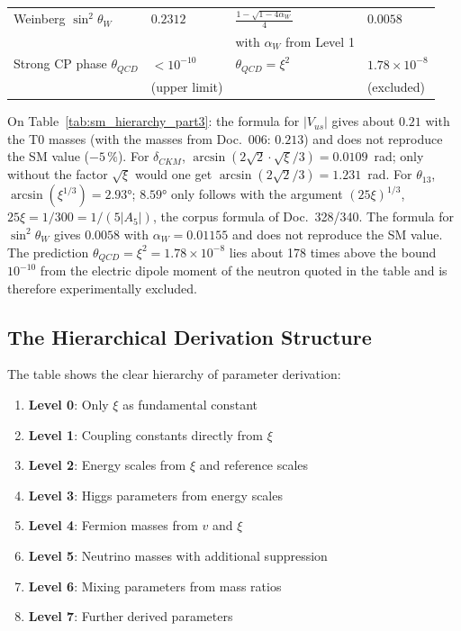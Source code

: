 \begin{table}[htbp]
{\begin{tabular}{p{3.8cm}p{2.5cm}p{3.5cm}p{2.8cm}}
	Weinberg $\sin^2\theta_W$ & $0.2312$ & $\tfrac{1{-}\sqrt{1{-}4\alpha_W}}{4}$ & $0.0058$ \\
	& & with $\alpha_W$ from Level 1 & \\[0.3em]
	
	Strong CP phase $\theta_{QCD}$ & $< 10^{-10}$ & $\theta_{QCD} = \xi^{2}$ & $1.78 \times 10^{-8}$ \\
	& (upper limit) & & (excluded) \\
	
\end{tabular}%
}
\end{table}
	
	On Table~\ref{tab:sm_hierarchy_part3}: the formula for $|V_{us}|$ gives about $0.21$ with the T0 masses (with the masses from Doc.~006: $0.213$) and does not reproduce the SM value ($-5\,\%$). For $\delta_{CKM}$, $\arcsin(2\sqrt2\cdot\sqrt{\xi}/3) = 0.0109$~rad; only without the factor $\sqrt{\xi}$ would one get $\arcsin(2\sqrt2/3) = 1.231$~rad. For $\theta_{13}$, $\arcsin(\xi^{1/3}) = 2.93°$; $8.59°$ only follows with the argument $(25\xi)^{1/3}$, $25\xi = 1/300 = 1/(5|A_5|)$, the corpus formula of Doc.~328/340. The formula for $\sin^2\theta_W$ gives $0.0058$ with $\alpha_W = 0.01155$ and does not reproduce the SM value. The prediction $\theta_{QCD} = \xi^2 = 1.78 \times 10^{-8}$ lies about 178 times above the bound $10^{-10}$ from the electric dipole moment of the neutron quoted in the table and is therefore experimentally excluded.
\normalsize

\subsection{The Hierarchical Derivation Structure}
\label{subsec:hierarchical_structure}

The table shows the clear hierarchy of parameter derivation:

\begin{enumerate}
	\item \textbf{Level 0}: Only $\xi$ as fundamental constant
	\item \textbf{Level 1}: Coupling constants directly from $\xi$
	\item \textbf{Level 2}: Energy scales from $\xi$ and reference scales
	\item \textbf{Level 3}: Higgs parameters from energy scales
	\item \textbf{Level 4}: Fermion masses from $v$ and $\xi$
	\item \textbf{Level 5}: Neutrino masses with additional suppression
	\item \textbf{Level 6}: Mixing parameters from mass ratios
	\item \textbf{Level 7}: Further derived parameters
\end{enumerate}


